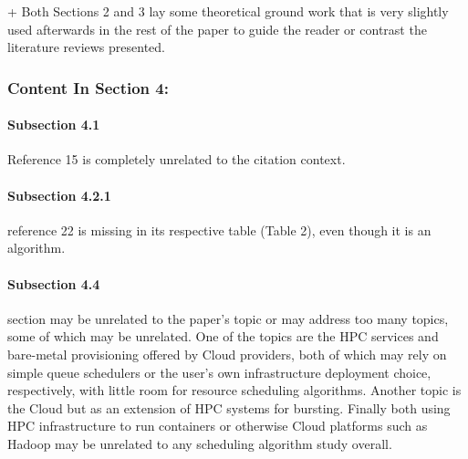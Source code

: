 + Both Sections 2 and 3 lay some theoretical ground work that is very
slightly used afterwards in the rest of the paper to guide the reader
or contrast the literature reviews presented.




\subsubsection{Content In Section 4:}

\paragraph{Subsection 4.1}

Reference 15 is completely unrelated to the citation context.


\paragraph{Subsection 4.2.1}

reference 22 is missing in its respective table
(Table 2), even though it is an algorithm.


\paragraph{Subsection 4.4}

section may be unrelated to the paper's topic or may address
too many topics, some of which may be unrelated. One of the topics are
the HPC services and bare-metal provisioning offered by Cloud
providers, both of which may rely on simple queue schedulers or the
user's own infrastructure deployment choice, respectively, with little
room for resource scheduling algorithms. Another topic is the Cloud
but as an extension of HPC systems for bursting. Finally both using
HPC infrastructure to run containers or otherwise Cloud platforms such
as Hadoop may be unrelated to any scheduling algorithm study overall.


